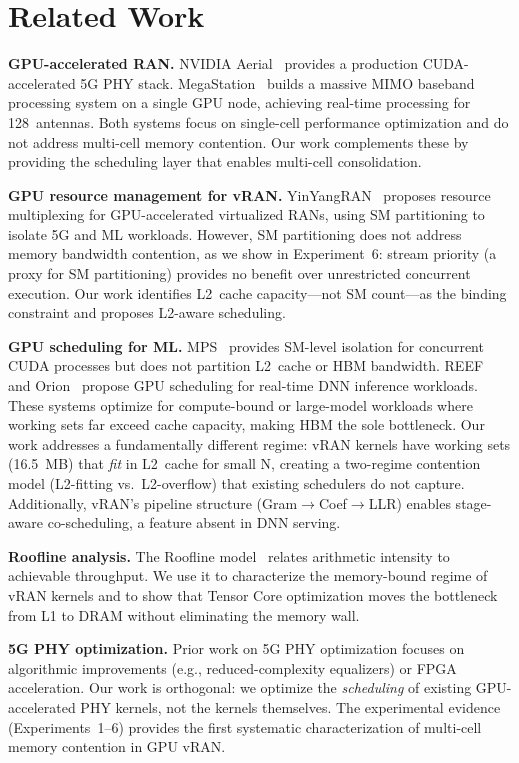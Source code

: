 \section{Related Work}
\label{sec:related}

\textbf{GPU-accelerated RAN.} NVIDIA Aerial~\cite{nvidia_aerial} provides a production CUDA-accelerated 5G PHY stack. MegaStation~\cite{megastation} builds a massive MIMO baseband processing system on a single GPU node, achieving real-time processing for 128~antennas. Both systems focus on single-cell performance optimization and do not address multi-cell memory contention. Our work complements these by providing the scheduling layer that enables multi-cell consolidation.

\textbf{GPU resource management for vRAN.} YinYangRAN~\cite{yinyangran} proposes resource multiplexing for GPU-accelerated virtualized RANs, using SM partitioning to isolate 5G and ML workloads. However, SM partitioning does not address memory bandwidth contention, as we show in Experiment~6: stream priority (a proxy for SM partitioning) provides no benefit over unrestricted concurrent execution. Our work identifies L2~cache capacity---not SM count---as the binding constraint and proposes L2-aware scheduling.

\textbf{GPU scheduling for ML.} MPS~\cite{nvidia_mps} provides SM-level isolation for concurrent CUDA processes but does not partition L2~cache or HBM bandwidth. REEF~\cite{reef} and Orion~\cite{orion} propose GPU scheduling for real-time DNN inference workloads. These systems optimize for compute-bound or large-model workloads where working sets far exceed cache capacity, making HBM the sole bottleneck. Our work addresses a fundamentally different regime: vRAN kernels have working sets (16.5~MB) that \emph{fit} in L2~cache for small N, creating a two-regime contention model (L2-fitting vs.\ L2-overflow) that existing schedulers do not capture. Additionally, vRAN's pipeline structure (Gram$\rightarrow$Coef$\rightarrow$LLR) enables stage-aware co-scheduling, a feature absent in DNN serving.

\textbf{Roofline analysis.} The Roofline model~\cite{roofline} relates arithmetic intensity to achievable throughput. We use it to characterize the memory-bound regime of vRAN kernels and to show that Tensor Core optimization moves the bottleneck from L1 to DRAM without eliminating the memory wall.

\textbf{5G PHY optimization.} Prior work on 5G PHY optimization focuses on algorithmic improvements (e.g., reduced-complexity equalizers) or FPGA acceleration. Our work is orthogonal: we optimize the \emph{scheduling} of existing GPU-accelerated PHY kernels, not the kernels themselves. The experimental evidence (Experiments~1--6) provides the first systematic characterization of multi-cell memory contention in GPU vRAN.
